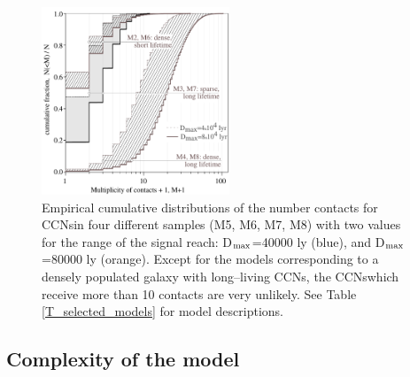 \documentclass[crop]{CSLB}
\newcommand{\cetis}{CCNs}
\begin{document}
 
 
\begin{figure} \centering
   \includegraphics[width=0.5\textwidth]{F_number_of_contacts.pdf}
   \caption{
Empirical cumulative distributions of the number contacts
for \cetis in four different samples (M5, M6, M7, M8) with two
values for the range of the signal reach: D$_{\rm max}$=40000 ly (blue),  and 
D$_{\rm max}$=80000 ly (orange).
%
Except for the models corresponding to a densely populated galaxy with
long--living \cetis, the \cetis which receive more than 10 contacts
are very unlikely.
%
See Table \ref{T_selected_models} for model descriptions.
%
   } \label{F_number_of_contacts}
\end{figure}
        
 

\subsection{Complexity of the model}
\end{document}

